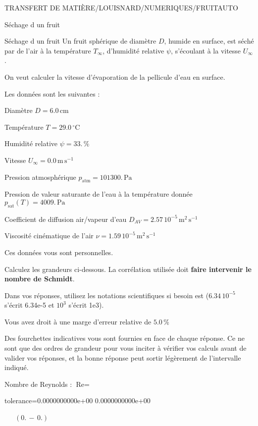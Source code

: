 \documentclass[12pt]{article}
\begin{document}
\begin{quiz}{TRANSFERT DE MATIÈRE/LOUISNARD/NUMERIQUES/FRUITAUTO}
\begin{cloze}{Séchage d un fruit}
\end{cloze} 


 \begin{cloze}{Séchage d un fruit} 
Un fruit sphérique de diamètre $D$, humide en surface, est séché par de l'air à la température $T_\infty$, d'humidité relative $\psi$, s'écoulant à la vitesse $U_\infty$.

On veut calculer la vitesse d'évaporation de la pellicule d'eau en surface.

 

Les données sont les suivantes :

 

Diamètre $D = 6.0\,  \mathrm{cm} $

Température $T = 29.0\,  \mathrm{^\circ\mathrm{C}} $

Humidité relative $\psi = 33.\, \% $

Vitesse $U_\infty = 0.0\,  \mathrm{m}\,  \mathrm{s}^{-1} $

Pression atmosphérique $p_{\text{atm}} = 101300.\,  \mathrm{Pa} $

Pression de valeur saturante de l’eau à la température donnée $p_{\text{sat}}(T) = 4009.\,  \mathrm{Pa} $

Coefficient de diffusion air/vapeur d’eau $D_{AV} =  2.57 \, 10^{-5} \,  \mathrm{m}^{2}\,  \mathrm{s}^{-1} $

Viscosité cinématique de l’air $\nu =  1.59 \, 10^{-5} \,  \mathrm{m}^{2}\,  \mathrm{s}^{-1} $

Ces données vous sont personnelles.

 

Calculez les grandeurs ci-dessous. La corrélation utilisée doit \textbf{faire intervenir le nombre de Schmidt}.

Dans vos réponses, utilisez les notations scientifiques si besoin est ($6.34\, 10^{-5}$ s'écrit 6.34e-5 et $10^{3}$ s'écrit 1e3).

Vous avez droit à une marge d'erreur relative de $5.0\, \% $

Des fourchettes indicatives vous sont fournies en face de chaque réponse. Ce ne sont que des ordres de grandeur pour vous inciter à vérifier vos calculs avant de valider vos réponses, et la bonne réponse peut sortir légèrement de l'intervalle indiqué.

 

Nombre de Reynolds : $\text{Re} =  $
\begin{numerical}[points=1] 
\item[tolerance={0.0000000000e+00}] 0.0000000000e+00 
\end{numerical} 
 $\,$ 
 $ \quad (0. \, - \, 0.) $ 


\end{cloze}
\end{quiz}
\end{document}
